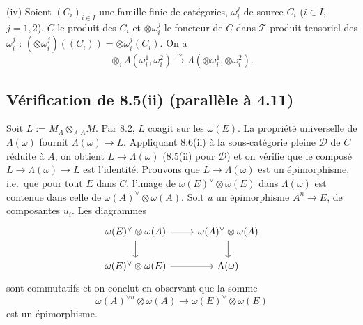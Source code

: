 \documentclass[12pt,a4paper]{article}
\theoremstyle{plain}
\theoremstyle{definition}
\begin{document}
\textup{(iv)} Soient $(C_i)_{i \in I}$ une famille finie de catégories, $\omega_i^j$ de source $C_i$ ($i \in I$, $j = 1, 2$), $C$ le produit des $C_i$ et $\otimes \omega_i^j$ le foncteur de $C$ dans $\mathcal{T}$ produit tensoriel des $\omega_i^j$ : $(\otimes \omega_i^j)((C_i)) = \otimes \omega_i^j(C_i)$. On a
\begin{equation}\label{eq:8.6.4}
\otimes_i \Lambda(\omega_i^1, \omega_i^2) \xrightarrow{\sim} \Lambda(\otimes \omega_i^1, \otimes \omega_i^2).
\end{equation}

\subsection{Vérification de 8.5\textup{(ii)} (parallèle à 4.11)}

Soit $L := M_A \otimes_A {_A M}$. Par 8.2, $L$ coagit sur les $\omega(E)$. La propriété universelle de $\Lambda(\omega)$ fournit $\Lambda(\omega) \to L$. Appliquant 8.6(ii) à la sous-catégorie pleine $\mathcal{D}$ de $C$ réduite à $A$, on obtient $L \to \Lambda(\omega)$ (8.5(ii) pour $\mathcal{D}$) et on vérifie que le composé $L \to \Lambda(\omega) \to L$ est l'identité. Prouvons que $L \to \Lambda(\omega)$ est un épimorphisme, i.e.~que pour tout $E$ dans $C$, l'image de $\omega(E)^\vee \otimes \omega(E)$ dans $\Lambda(\omega)$ est contenue dans celle de $\omega(A)^\vee \otimes \omega(A)$. Soit $u$ un épimorphisme $A^n \to E$, de composantes $u_i$. Les diagrammes
\[
\begin{tikzcd}
\omega(E)^\vee \otimes \omega(A) \arrow[r] \arrow[d] & \omega(A)^\vee \otimes \omega(A) \arrow[d] \\
\omega(E)^\vee \otimes \omega(E) \arrow[r] & \Lambda(\omega)
\end{tikzcd}
\]
sont commutatifs et on conclut en observant que la somme
\[
\omega(A)^{\vee n} \otimes \omega(A) \to \omega(E)^\vee \otimes \omega(E)
\]
est un épimorphisme.

\subsection{}
\end{document}
